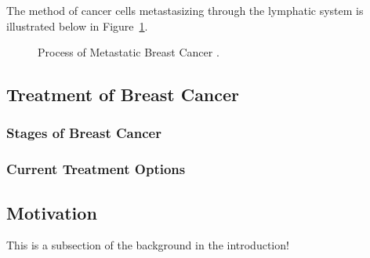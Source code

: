The method of cancer cells metastasizing through the lymphatic system is illustrated below in Figure~\ref{fig:introduction:process_of_metastatic_breast_cancer}.

\begin{figure}[h!]
        \centering
        \caption{Process of Metastatic Breast Cancer \cite{RefWorks:RefID:364-riggio2020lingering}.}
        \label{fig:introduction:process_of_metastatic_breast_cancer}
\end{figure}

\subsection{Treatment of Breast Cancer\label{sec:introduction:treatmentofbreastcancer}}

\subsubsection{Stages of Breast Cancer\label{sec:introduction:breastcancer:stagesofbreastcancer}}

\subsubsection{Current Treatment Options\label{sec:introduction:breastcancer:currenttreatmentoptions}}

\subsection{Motivation\label{sec:introduction:motivation}}
This is a subsection of the background in the introduction!
